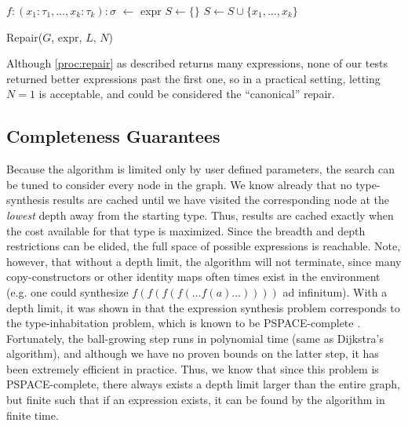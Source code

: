 \begin{procedure}
$f: (x_1: \tau_1, \ldots, x_k: \tau_k): \sigma$ $\leftarrow$ expr\;
$S \leftarrow \{\}$ \;
$S \leftarrow S \cup \{x_1,\ldots,x_k\}$ \;
\caption{Repair($G$, expr, $L$, $N$)}\label{proc:repair}
\end{procedure}

Although \ref{proc:repair} as described returns many expressions, none of our tests returned better expressions past the first one, so in a practical setting, letting $N=1$ is acceptable, and could be considered the ``canonical'' repair.

\subsection{Completeness Guarantees}

Because the algorithm is limited only by user defined parameters, the search can be tuned to consider every node in the graph. We know already that no type-synthesis results are cached until we have visited the corresponding node at the \textit{lowest} depth away from the starting type. Thus, results are cached exactly when the cost available for that type is maximized. Since the breadth and depth restrictions can be elided, the full space of possible expressions is reachable. Note, however, that without a depth limit, the algorithm will not terminate, since many copy-constructors or other identity maps often times exist in the environment (e.g. one could synthesize $f(f(f(f(\ldots f(a)\ldots ))))$ ad infinitum). With a depth limit, it was shown in \citep{GveroETAL13CompleteCompletionTypesWeights} that the expression synthesis problem corresponds to the type-inhabitation problem, which is known to be PSPACE-complete \citep{Urzyczyn97}. Fortunately, the ball-growing step runs in polynomial time (same as Dijkstra's algorithm), and although we have no proven bounds on the latter step, it has been extremely efficient in practice. Thus, we know that since this problem is PSPACE-complete, there always exists a depth limit larger than the entire graph, but finite such that if an expression exists, it can be found by the algorithm in finite time.
